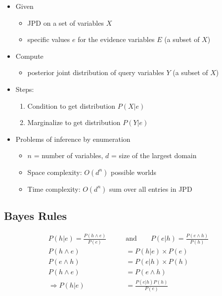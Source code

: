 \documentclass{article}
\begin{document}
\begin{itemize}
    \item Given
        \begin{itemize}
            \item JPD on a set of variables $X$
            \item specific values $e$ for the evidence variables $E$ (a subset of $X$)
        \end{itemize}
    \item Compute
        \begin{itemize}
            \item posterior joint distribution of query variables $Y$ (a subset of $X$)
        \end{itemize}
    \item Steps:
        \begin{enumerate}
            \item Condition to get distribution $P(X|e)$
            \item Marginalize to get distribution $P(Y|e)$
        \end{enumerate}
    \item Problems of inference by enumeration
        \begin{itemize}
            \item $n$ = number of variables, $d$ = size of the largest domain
            \item Space complexity: $O(d^n)$ possible worlds
            \item Time complexity: $O(d^n)$ sum over all entries in JPD
        \end{itemize}
\end{itemize}

\subsection{Bayes Rules}

\begin{align*}
    P(h|e) = \frac{P(h \wedge e)}{P(e)} \qquad &\text{and} \qquad P(e|h) = \frac{P(e \wedge h)}{P(h)} \\
    P(h \wedge e) &= P(h|e) \times P(e) \\
    P(e \wedge h) &= P(e|h) \times P(h) \\
    P(h \wedge e) &= P(e \wedge h) \\
    \Rightarrow P(h|e) &= \frac{P(e|h)P(h)}{P(e)}
\end{align*}
\end{document}
